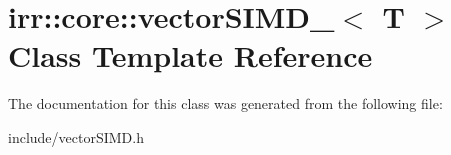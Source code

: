 \hypertarget{classirr_1_1core_1_1vectorSIMD__16}{}\section{irr\+:\+:core\+:\+:vector\+S\+I\+M\+D\+\_$<$ T $>$ Class Template Reference}
\label{classirr_1_1core_1_1vectorSIMD__16}


The documentation for this class was generated from the following file\+:\begin{DoxyCompactItemize}
\item 
include/vector\+S\+I\+M\+D.\+h\end{DoxyCompactItemize}
